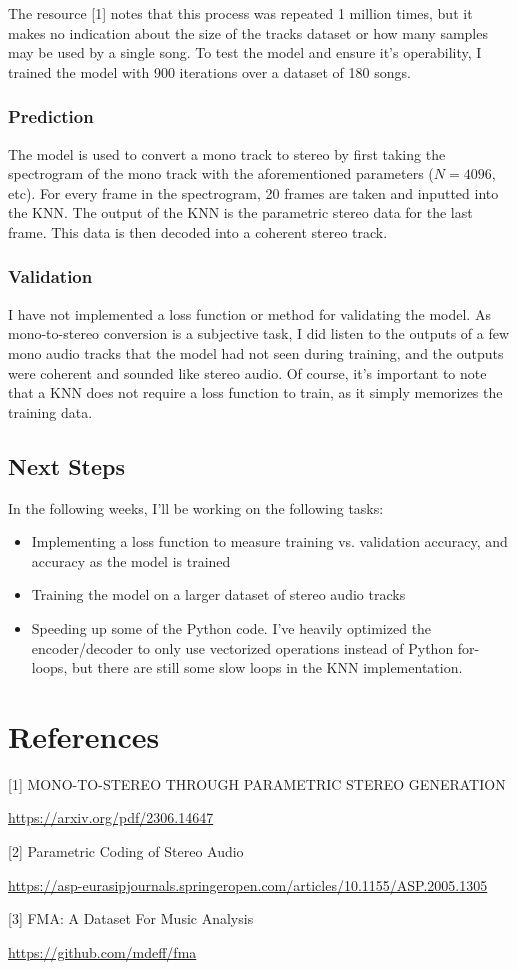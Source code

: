 \documentclass{article}
\begin{document}
The resource [1] notes that this process was repeated 1 million times, but it makes no indication about the size of the tracks dataset or how many samples may be used by a single song. To test the model and ensure it's operability, I trained the model with 900 iterations over a dataset of 180 songs.

\subsubsection{Prediction}
The model is used to convert a mono track to stereo by first taking the spectrogram of the mono track with the aforementioned parameters ($N=4096$, etc). For every frame in the spectrogram, 20 frames are taken and inputted into the KNN. The output of the KNN is the parametric stereo data for the last frame. This data is then decoded into a coherent stereo track.

\subsubsection{Validation}
I have not implemented a loss function or method for validating the model. As mono-to-stereo conversion is a subjective task, I did listen to the outputs of a few mono audio tracks that the model had not seen during training, and the outputs were coherent and sounded like stereo audio. Of course, it's important to note that a KNN does not require a loss function to train, as it simply memorizes the training data.

\subsection{Next Steps}
In the following weeks, I'll be working on the following tasks:

\begin{itemize}
  \item Implementing a loss function to measure training vs. validation accuracy, and accuracy as the model is trained
  \item Training the model on a larger dataset of stereo audio tracks
  \item Speeding up some of the Python code. I've heavily optimized the encoder/decoder to only use vectorized operations instead of Python for-loops, but there are still some slow loops in the KNN implementation.
\end{itemize}

\section*{References}

\small

[1] MONO-TO-STEREO THROUGH PARAMETRIC STEREO GENERATION

\url{https://arxiv.org/pdf/2306.14647}


[2] Parametric Coding of Stereo Audio

\url{https://asp-eurasipjournals.springeropen.com/articles/10.1155/ASP.2005.1305}

[3] FMA: A Dataset For Music Analysis

\url{https://github.com/mdeff/fma}
\end{document}

